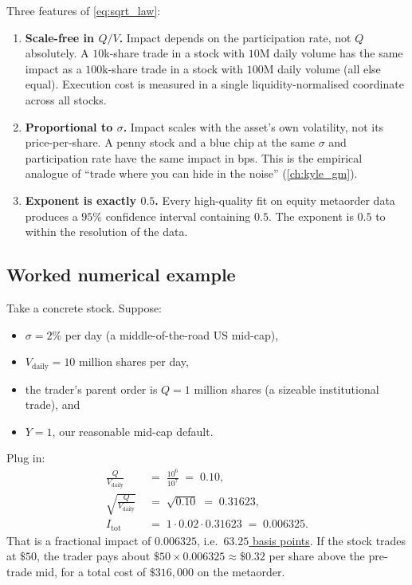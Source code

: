 Three features of \cref{eq:sqrt_law}:

\begin{enumerate}
  \item \textbf{Scale-free in $Q / V$.} Impact depends on the
  participation rate, not $Q$ absolutely. A $10$k-share trade in a
  stock with $10$M daily volume has the same impact as a $100$k-share
  trade in a stock with $100$M daily volume (all else equal).
  Execution cost is measured in a single liquidity-normalised
  coordinate across all stocks.
  \item \textbf{Proportional to $\sigma$.} Impact scales with the
  asset's own volatility, not its price-per-share. A penny stock and
  a blue chip at the same $\sigma$ and participation rate have the
  same impact in bps. This is the empirical analogue of ``trade where
  you can hide in the noise'' (\cref{ch:kyle_gm}).
  \item \textbf{Exponent is exactly $0.5$.} Every high-quality fit
  on equity metaorder data produces a $95\%$ confidence interval
  containing $0.5$. The exponent is $0.5$ to within the resolution
  of the data.
\end{enumerate}

\subsection{Worked numerical example}
\label{subsec:sqrt_worked}

Take a concrete stock. Suppose:
\begin{itemize}
  \item $\sigma = 2\%$ per day (a middle-of-the-road US mid-cap),
  \item $V_{\text{daily}} = 10$ million shares per day,
  \item the trader's parent order is $Q = 1$ million shares
  (a sizeable institutional trade), and
  \item $Y = 1$, our reasonable mid-cap default.
\end{itemize}
Plug in:
\begin{align*}
  \frac{Q}{V_{\text{daily}}}
  \;&=\; \frac{10^6}{10^7} \;=\; 0.10, \\[4pt]
  \sqrt{\frac{Q}{V_{\text{daily}}}}
  \;&=\; \sqrt{0.10}
  \;=\; 0.31623,  \\[4pt]
  I_{\text{tot}}
  \;&=\; 1 \cdot 0.02 \cdot 0.31623
  \;=\; 0.006325.
\end{align*}
That is a fractional impact of $0.006325$, i.e.\
\underline{$63.25$ basis points}. If the stock trades at $\$50$, the
trader pays about $\$50 \times 0.006325 \approx \$0.32$ per share
above the pre-trade mid, for a total cost of $\$316{,}000$ on the
metaorder.


